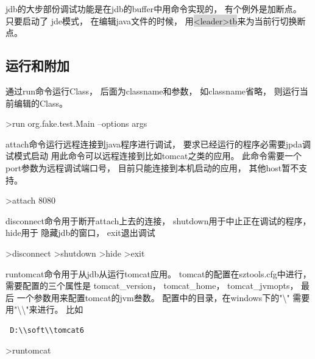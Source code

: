 \documentclass[oneside,openany]{book}
\begin{document}
    jdb的大步部份调试功能是在jdb的buffer中用命令实现的， 有个例外是加断点。 只要启动了
    jde模式， 在编辑java文件的时候， 用\colorbox{lightgray}{<leader>tb}来为当前行切换断点。

  \subsection{运行和附加}
    
    通过run命令运行Class， 后面为classname和参数， 如classname省略， 则运行当前编辑的Class。
    \begin{mdframed}[style=SmallFrame]
    \begin{flushleft}
    >run org.fake.test.Main --options args
    \end{flushleft}
    \end{mdframed}
    \vspace{4mm}

    attach命令运行远程连接到java程序进行调试， 要求已经运行的程序必需要jpda调试模式启动
    用此命令可以远程连接到比如tomcat之类的应用。 此命令需要一个port参数为远程调试端口号， 
    目前只能连接到本机启动的应用， 其他host暂不支持。
    \begin{mdframed}[style=SmallFrame]
    \begin{flushleft}
    >attach 8080              
    \end{flushleft}
    \end{mdframed}
    \vspace{4mm}

    disconnect命令用于断开attach上去的连接， shutdown用于中止正在调试的程序， hide用于
    隐藏jdb的窗口， exit退出调试 
    \begin{mdframed}[style=SmallFrame]
     \begin{flushleft}
    >disconnect\newline
    >shutdown\newline
    >hide\newline
    >exit                      
    \end{flushleft}
    \end{mdframed}
    \vspace{5mm}

    runtomcat命令用于从jdb从运行tomcat应用。 tomcat的配置在sztools.cfg中进行， 
    需要配置的三个属性是 tomcat\_version， tomcat\_home， tomcat\_jvmopts， 最后
    一个参数用来配置tomcat的jvm叁数。 配置中的目录，在windows下的"\textbackslash"
    需要用"\textbackslash\textbackslash"来进行。 比如
    \begin{verbatim} D:\\soft\\tomcat6 \end{verbatim}
    \begin{mdframed}[style=SmallFrame]
     \begin{flushleft}
      >runtomcat
     \end{flushleft}
    \end{mdframed}
\end{document}
